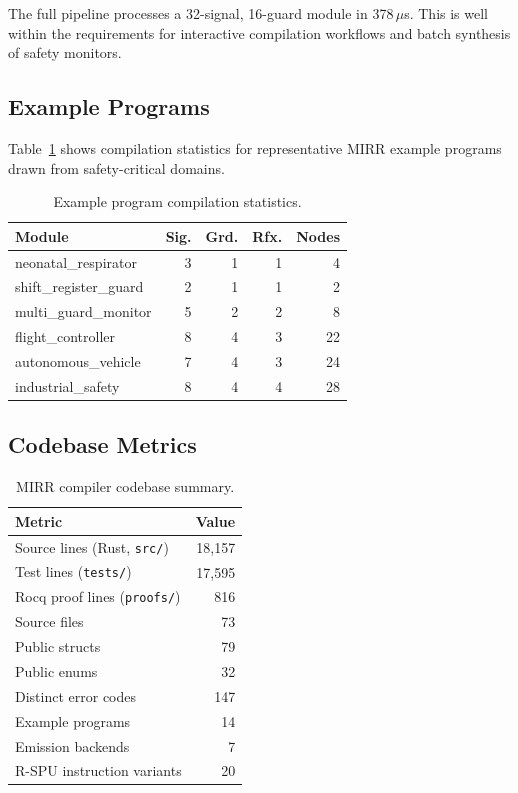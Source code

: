 \documentclass[conference]{IEEEtran}
\begin{document}
The full pipeline processes a 32-signal, 16-guard module in 378\,$\mu$s.
This is well within the requirements for interactive compilation
workflows and batch synthesis of safety monitors.

\subsection{Example Programs}

Table~\ref{tab:examples} shows compilation statistics for representative
MIRR example programs drawn from safety-critical domains.

\begin{table}[t]
\centering
\footnotesize
\caption{Example program compilation statistics.}
\label{tab:examples}
\begin{tabular}{@{}lrrrr@{}}
\toprule
\textbf{Module} & \textbf{Sig.} & \textbf{Grd.} & \textbf{Rfx.} & \textbf{Nodes} \\
\midrule
neonatal\_respirator  & 3 & 1 & 1 &  4 \\
shift\_register\_guard & 2 & 1 & 1 &  2 \\
multi\_guard\_monitor  & 5 & 2 & 2 &  8 \\
flight\_controller    & 8 & 4 & 3 & 22 \\
autonomous\_vehicle   & 7 & 4 & 3 & 24 \\
industrial\_safety    & 8 & 4 & 4 & 28 \\
\bottomrule
\end{tabular}
\end{table}

\subsection{Codebase Metrics}

\begin{table}[t]
\centering
\footnotesize
\caption{MIRR compiler codebase summary.}
\label{tab:codebase}
\begin{tabular}{@{}lr@{}}
\toprule
\textbf{Metric} & \textbf{Value} \\
\midrule
Source lines (Rust, \texttt{src/})          & 18,157 \\
Test lines (\texttt{tests/})                & 17,595 \\
Rocq proof lines (\texttt{proofs/})         & 816 \\
Source files                                 & 73 \\
Public structs                               & 79 \\
Public enums                                 & 32 \\
Distinct error codes                         & 147 \\
Example programs                             & 14 \\
Emission backends                            & 7 \\
R-SPU instruction variants                   & 20 \\
\bottomrule
\end{tabular}
\end{table}
\end{document}
